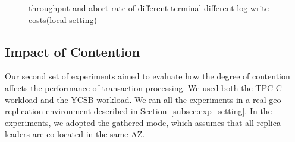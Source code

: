 \documentclass[conference]{IEEEtran}
\begin{document}
\begin{figure}[htbp]
  \centering
  


\caption{throughput and abort rate of
different terminal different log write costs(local setting)}
\label{fig:new_order_add_log_cost_local}
\end{figure}



\subsection{Impact of Contention}

Our second set of experiments aimed to evaluate how the degree of contention affects the performance of transaction processing.
We used both the TPC-C workload and the YCSB workload.
We ran all the experiments in a real geo-replication environment described in Section~\ref{subsec:exp_setting}.
In the experiments, we adopted the gathered mode, which assumes that all replica leaders are co-located in the same AZ. 
\end{document}
